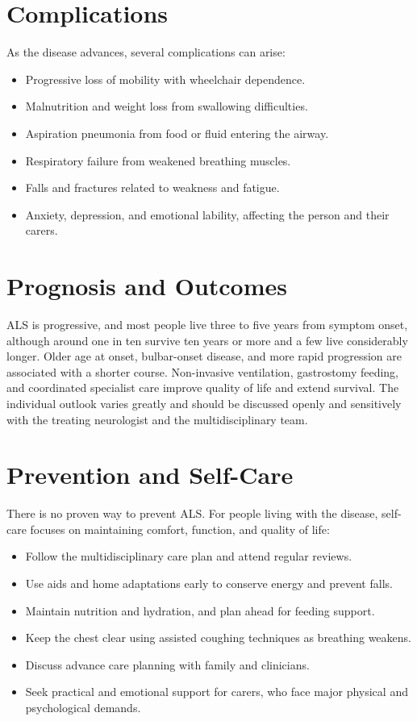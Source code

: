 \section*{Complications}
As the disease advances, several complications can arise:

\begin{itemize}
    \item Progressive loss of mobility with wheelchair dependence.
    \item Malnutrition and weight loss from swallowing difficulties.
    \item Aspiration pneumonia from food or fluid entering the airway.
    \item Respiratory failure from weakened breathing muscles.
    \item Falls and fractures related to weakness and fatigue.
    \item Anxiety, depression, and emotional lability, affecting the person and their carers.
\end{itemize}

\section*{Prognosis and Outcomes}
ALS is progressive, and most people live three to five years from symptom onset, although around one in ten survive ten years or more and a few live considerably longer. Older age at onset, bulbar-onset disease, and more rapid progression are associated with a shorter course. Non-invasive ventilation, gastrostomy feeding, and coordinated specialist care improve quality of life and extend survival. The individual outlook varies greatly and should be discussed openly and sensitively with the treating neurologist and the multidisciplinary team.

\section*{Prevention and Self-Care}
There is no proven way to prevent ALS. For people living with the disease, self-care focuses on maintaining comfort, function, and quality of life:

\begin{itemize}
    \item Follow the multidisciplinary care plan and attend regular reviews.
    \item Use aids and home adaptations early to conserve energy and prevent falls.
    \item Maintain nutrition and hydration, and plan ahead for feeding support.
    \item Keep the chest clear using assisted coughing techniques as breathing weakens.
    \item Discuss advance care planning with family and clinicians.
    \item Seek practical and emotional support for carers, who face major physical and psychological demands.
\end{itemize}

